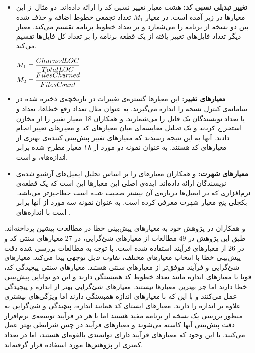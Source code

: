 \begin{itemize}
\item \textbf{تغییر تبدیلی نسبی کد: }
 هشت معیار تغییر  نسبی کد را ارائه داده‌اند\cite{nagappan2005use}. دو مثال از این معیارها در زیر آمده است.  در معیار $M_1 $ تعداد تجمعی خطوط اضافه و حذف شده بین دو نسخه از برنامه را می‌شمارد و بر تعداد خطوط برنامه تقسیم می‌کند. معیار دیگر تعداد فایل‌های تغییر یافته از یک قطعه برنامه را بر تعداد  کل فایل‌ها تقسیم می‌کند. 
\begin{latin}
\baselineskip=1.1cm
$M_1 =\mathlarger{\frac{ Churned LOC }{ Total LOC}}$\\
$M_2 =\mathlarger{\frac{ Files Churned}{ Files Count}}$
\end{latin}

\item \textbf{معیارهای تغییر: }
این معیارها  گستره‌ی تغییرات در تاریخچه‌ی ذخیره شده در سامانه‌ی کنترل نسخه را اندازه می‌گیرند. به عنوان مثال تعداد رفع خطاها، تعداد  و یا تعداد نویسندگان یک فایل را می‌شمارند.  و همکاران 18 معیار تغییر را از مخازن  استخراج کردند و یک تحلیل مقایسه‌ای میان معیارهای کد و معیارهای تغییر انجام دادند. آنها به این نتیجه رسیدند که معیارهای تغییر پیش‌بینی کننده‌ی بهتری از معیارهای کد هستند.  به عنوان نمونه دو مورد از ۱۸ معیار مطرح شده برابر اندازه‌های  و  است.

\item \textbf{معیارهای شهرت: }
  و همکاران معیارهای  را بر اساس تحلیل ایمیل‌های آرشیو شده‌ی نویسندگان ارائه داده‌اند. ایده‌ی اصلی این معیارها این است که یک قطعه‌ی  نرم‌افزاری که در ایمیل‌ها درباره‌ی آن بیشتر صحبت شده است خطاخیزتر می‌باشد\cite{bacchelli2010popular}.  بکچلی پنج معیار شهرت معرفی کرده است.  به عنوان نمونه سه مورد از آنها  برابر است با اندازه‌های . \\
\end{itemize}


 و همکاران در پژوهش خود به  معیارهای پیش‌بینی خطا در مطالعات پیشین پرداخته‌اند.  طبق این پژوهش در 49\lr{\%} مطالعات از معیارهای شئ‌گرایی، در 27\lr{\%} معیارهای سنتی کد و در 26 \lr{\%} از معیارهای فرآیند استفاده شده است. با توجه به مطالعات بررسی شده دقت پیش‌بینی خطا  با انتخاب معیارهای مختلف، تفاوت قابل توجهی  پیدا می‌کند. معیارهای شئ‌گرایی و فرآیند موفق‌تر از معیارهای سنتی هستند. معیارهای سنتی  پیچیدگی کد، قویا با معیارهای اندازه مانند تعداد خطوط کد همبستگی دارند و این دو توانایی پیش‌بینی خطا دارند اما جز بهترین معیارها نیستند. معیارهای شئ‌گرایی بهتر از اندازه و پیچیدگی عمل می‌کنند و با این که با معیارهای اندازه همبستگی دارند اما ویژگی‌های بیشتری علاوه بر اندازه را دارند. معیارهای ایستای کد همانند اندازه، پیچیدگی و شئ‌گرایی به منظور بررسی یک نسخه از برنامه مفید هستند اما با هر  در فرآیند توسعه‌ی نرم‌افزار دقت پیش‌بینی آنها کاسته می‌شوند و معیارهای فرآیند در چنین شرایطی بهتر عمل می‌کنند.  با این وجود  که  معیارهای فرآیند‌  دارای توانمندی بالقوه‌ای  هستند، اما در تعداد کمتری از پژوهش‌ها مورد استفاده قرار گرفته‌اند\cite{radjenovic2013software}. \\
 
